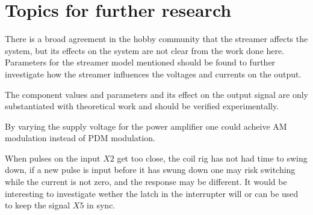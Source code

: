 \section{Topics for further research}

There is a broad agreement in the hobby community that the streamer affects the system, but its effects on the system are not clear from the work done here. Parameters for the streamer model mentioned should be found to further investigate how the streamer influences the voltages and currents on the output.

The component values and parameters and its effect on the output signal are only substantiated with theoretical work and should be verified experimentally.

By varying the supply voltage for the power amplifier one could acheive AM modulation instead of PDM modulation.

When pulses on the input $X2$ get too close, the coil rig has not had time to swing down, if a new pulse is input before it has swung down one may risk switching while the current is not zero, and the response may be different. It would be interesting to investigate wether the latch in the interrupter will or can be used to keep the signal $X5$ in sync.
